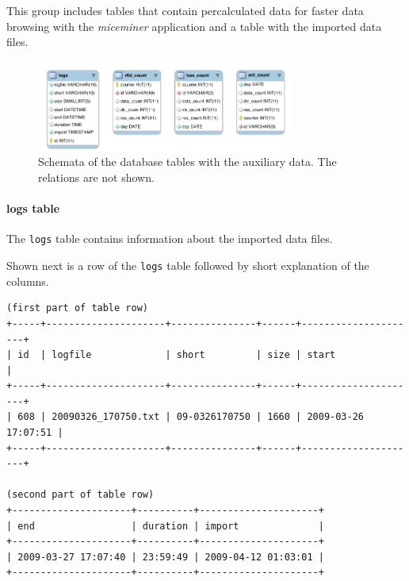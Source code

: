 This group includes tables that contain percalculated data for faster data browsing with the \textit{miceminer} application and a table with the imported data files. 

\begin{figure}[htpb]
\begin{center}
  \includegraphics[width=0.75\textwidth]{assets/pdf/auxiliary_tables_schema.pdf}
  \caption[Schema of database tables with system member data]{Schemata of the database tables with the auxiliary data. The relations are not shown.}
  \label{fig:auxiliary_tables}
\end{center}
\end{figure}

\paragraph{logs table}
\label{para:logs_table} 

The \lstinline|logs| table contains information about the imported data files.

Shown next is a row of the \lstinline|logs| table followed by short explanation of the columns.

\codescript
\begin{lstlisting}[frame=none]
(first part of table row)
+-----+---------------------+---------------+------+---------------------+
| id  | logfile             | short         | size | start               |
+-----+---------------------+---------------+------+---------------------+
| 608 | 20090326_170750.txt | 09-0326170750 | 1660 | 2009-03-26 17:07:51 |
+-----+---------------------+---------------+------+---------------------+

(second part of table row)
+---------------------+----------+---------------------+
| end                 | duration | import              |
+---------------------+----------+---------------------+
| 2009-03-27 17:07:40 | 23:59:49 | 2009-04-12 01:03:01 | 
+---------------------+----------+---------------------+

\end{lstlisting}

